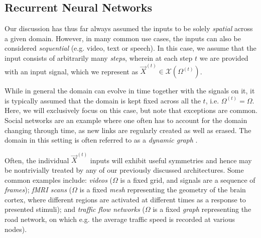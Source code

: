 \subsection{Recurrent Neural Networks}

Our discussion has thus far always assumed the inputs to be solely \emph{spatial} across a given domain. However, in many common use cases, the inputs can also be considered \emph{sequential} (e.g. video, text or speech). In this case, we assume that the input consists of arbitrarily many \emph{steps}, wherein at each step $t$ we are provided with an input signal, which we represent as $\vec{X}^{(t)} \in \mathcal{X}(\Omega^{(t)})$.

While in general the domain can evolve in time together with the signals on it, it is typically assumed that the domain is kept fixed across all the $t$, i.e. $\Omega^{(t)} = \Omega$. Here, we will exclusively focus on this case, but note that exceptions are common. Social networks are an example where one often has to account for the domain changing through time, as new links are regularly created as well as erased. The domain in this  setting is often referred to as a \emph{dynamic graph} \citep{xu2020inductive,rossi2020temporal}.

Often, the individual $\vec{X}^{(t)}$ inputs will exhibit useful symmetries and hence may be nontrivially treated by any of our previously discussed architectures. Some common examples include: \emph{videos} ($\Omega$ is a fixed grid, and signals are a sequence of \emph{frames}); \emph{fMRI scans} ($\Omega$ is a fixed \emph{mesh} representing the geometry of the brain cortex, where different regions are activated at different times as a response to presented stimuli); and \emph{traffic flow networks} ($\Omega$ is a fixed \emph{graph} representing the road network, on which e.g. the average traffic speed is recorded at various nodes).



